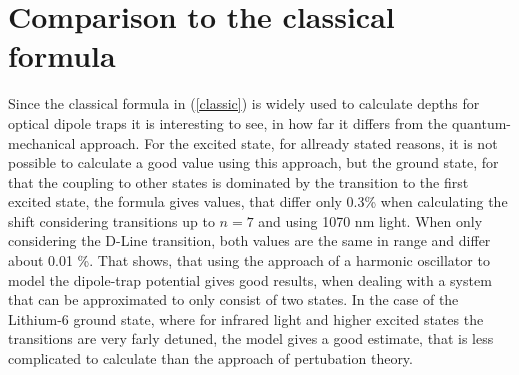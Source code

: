 

\section{Comparison to the classical formula}

Since the classical formula in (\ref{classic}) is widely used to calculate depths for optical dipole traps it is interesting to see, in how far it differs from the quantum-mechanical approach. For the excited state, for allready stated reasons, it is not possible to calculate a good value using this approach, but the ground state, for that the coupling to other states is dominated by the transition to the first excited state, the formula gives values, that differ only 0.3\% when calculating the shift considering transitions up to $n=7$ and using 1070 nm light. When only considering the D-Line transition, both values are the same in range and differ about 0.01 \%. That shows, that using the approach of a harmonic oscillator to model the dipole-trap potential gives good results, when dealing with a system that can be approximated to only consist of two states. In the case of the Lithium-6 ground state, where for infrared light and higher excited states the transitions are very farly detuned, the model gives a good estimate, that is less complicated to calculate than the approach of pertubation theory.